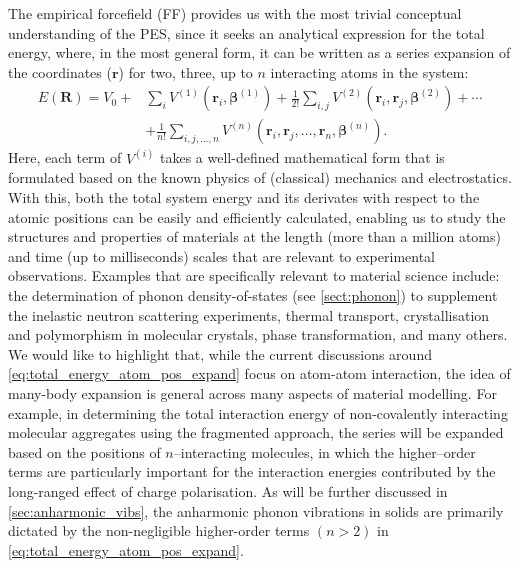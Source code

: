 
The empirical forcefield (FF) provides us with the most trivial conceptual understanding of the PES, since it seeks  an analytical expression for the total energy, where, in the most general form, it can be written as a series expansion of the  coordinates ($\bm{r}$) for two, three, up to $n$ interacting atoms in the system:
\begin{align}\label{eq:total_energy_atom_pos_expand}
E(\bm{R})=V_{0}+&\sum_{i}V^{(1)}(\bm{r}_{i},\bm{\beta}^{(1)})
               +\frac{1}{2!}\sum_{i,j}V^{(2)}(\bm{r}_{i},\bm{r}_{j},\bm{\beta}^{(2)})+\cdots\nonumber\\
               &+\frac{1}{n!}\sum_{i,j,\ldots,n}V^{(n)}(\bm{r}_{i},\bm{r}_{j},\ldots,\bm{r}_{n},\bm{\beta}^{(n)}).
\end{align} 
Here, each term of $V^{(i)}$ takes a well-defined mathematical form that is formulated based on the known physics of (classical) mechanics and electrostatics. With this, both the total system energy and its derivates with respect to the atomic positions can be easily and efficiently calculated, enabling us to study the structures and properties of materials at the length  (more than a million atoms) and time (up to milliseconds\cite{pierce2012routine}) scales that are relevant to experimental observations. Examples that are specifically relevant to material science include: the determination of phonon density-of-states (see \cref{sect:phonon}) to supplement the inelastic neutron scattering experiments,\cite{cheng2019simulation} thermal transport,\cite{esfarjani2011heat} crystallisation and polymorphism in molecular crystals,\cite{raiteri2005exploring} phase transformation,\cite{pols2021atomistic} and many others. We would like to highlight that, while the current discussions  around \cref{eq:total_energy_atom_pos_expand} focus on atom-atom interaction, the idea of many-body expansion is general across many aspects of material modelling. For example, in determining the total interaction energy of non-covalently interacting molecular aggregates using the fragmented approach,\cite{mahadevi2016cooperativity,wen2012practical} the series will be expanded based on the positions of $n$--interacting molecules, in which the higher--order terms are particularly important for the interaction energies contributed by the long-ranged effect of charge polarisation. As will be further discussed in \cref{sec:anharmonic_vibs}, the anharmonic phonon vibrations in solids are primarily dictated by the non-negligible higher-order terms $(n>2)$ in   \cref{eq:total_energy_atom_pos_expand}. 

